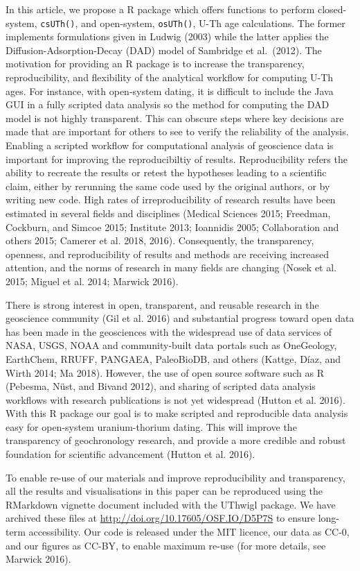 \documentclass[]{elsarticle} %
\begin{document}
In this article, we propose a R package which offers functions to perform closed-system, \texttt{csUTh()}, and open-system, \texttt{osUTh()}, U-Th age calculations. The former implements formulations given in Ludwig (2003) while the latter applies the Diffusion-Adsorption-Decay (DAD) model of Sambridge et al.~(2012).
The motivation for providing an R package is to increase the transparency, reproducibility, and flexibility of the analytical workflow for computing U-Th ages. For instance, with open-system dating, it is difficult to include the Java GUI in a fully scripted data analysis so the method for computing the DAD model is not highly transparent. This can obscure steps where key decisions are made that are important for others to see to verify the reliability of the analysis. Enabling a scripted workflow for computational analysis of geoscience data is important for improving the reproducibiltiy of results. Reproducibility refers the ability to recreate the results or retest the hypotheses leading to a scientific claim, either by rerunning the same code used by the original authors, or by writing new code. High rates of irreproducibility of research results have been estimated in several fields and disciplines (Medical Sciences 2015; Freedman, Cockburn, and Simcoe 2015; Institute 2013; Ioannidis 2005; Collaboration and others 2015; Camerer et al. 2018, 2016). Consequently, the transparency, openness, and reproducibility of results and methods are receiving increased attention, and the norms of research in many fields are changing (Nosek et al. 2015; Miguel et al. 2014; Marwick 2016).

There is strong interest in open, transparent, and reusable research in the geoscience community (Gil et al. 2016) and substantial progress toward open data has been made in the geosciences with the widespread use of data services of NASA, USGS, NOAA and community-built data portals such as OneGeology, EarthChem, RRUFF, PANGAEA, PaleoBioDB, and others (Kattge, Díaz, and Wirth 2014; Ma 2018). However, the use of open source software such as R (Pebesma, Nüst, and Bivand 2012), and sharing of scripted data analysis workflows with research publications is not yet widespread (Hutton et al. 2016). With this R package our goal is to make scripted and reproducible data analysis easy for open-system uranium-thorium dating. This will improve the transparency of geochronology research, and provide a more credible and robust foundation for scientific advancement (Hutton et al. 2016).

To enable re-use of our materials and improve reproducibility and transparency, all the results and visualisations in this paper can be reproduced using the RMarkdown vignette document included with the UThwigl package. We have archived these files at \url{http://doi.org/10.17605/OSF.IO/D5P7S} to ensure long-term accessibility. Our code is released under the MIT licence, our data as CC-0, and our figures as CC-BY, to enable maximum re-use (for more details, see Marwick 2016).
\end{document}
